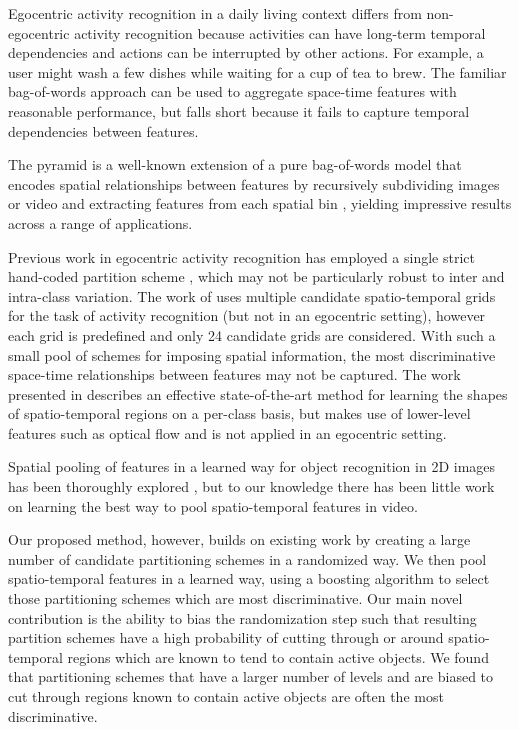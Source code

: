 \documentclass{bmvc2k}
\begin{document}
  Egocentric activity recognition in a daily living context differs from
  non-egocentric activity recognition because activities can have long-term
  temporal dependencies and actions can be interrupted by other actions. For
  example, a user might wash a few dishes while waiting for a cup of tea
  to brew. The familiar bag-of-words approach can be used to aggregate space-time
  features with reasonable performance,  but falls short because it
  fails to capture temporal dependencies between features.

  The pyramid is a well-known extension of a pure bag-of-words model that encodes spatial
  relationships between features by recursively subdividing images or video and extracting 
  features from each spatial bin \cite{Lazebnik06}, yielding impressive
  results across a range of applications.

  Previous work in egocentric activity recognition has employed a single strict
  hand-coded partition scheme \cite{Ramanan12}, which may not be particularly robust to
  inter and intra-class variation. The work of \cite{Laptev08} uses multiple
  candidate spatio-temporal grids for the task of activity recognition (but
  not in an egocentric setting), however each grid is predefined and only 24
  candidate grids are considered. With such a small pool of schemes for imposing spatial
  information, the most discriminative space-time relationships between features may not be 
  captured. The work presented in \cite{Kovashka10}
  describes an effective state-of-the-art method for learning the shapes of spatio-temporal
  regions on a per-class basis, but makes use of lower-level features such as optical flow and
  is not applied in an egocentric setting.

  Spatial pooling of features in a learned way for object recognition in 2D images
  has been thoroughly
  explored \cite{Sharma11}, but to our knowledge there has been little work
  on learning the best way to pool spatio-temporal features in video.
  
  Our proposed method, however, builds on existing work by creating a large number
  of candidate partitioning schemes in a randomized way. 
  We then pool spatio-temporal features in a
  learned way, using a boosting algorithm to select those partitioning schemes which are most discriminative.
  Our main novel contribution is
  the ability to bias the randomization step such that 
  resulting partition schemes have a high probability of cutting through or around
  spatio-temporal regions which are known to tend to contain active objects.
  We found that partitioning schemes that have a larger number of levels and
  are biased to cut through regions known to contain active
  objects are often the most discriminative.
\end{document}
